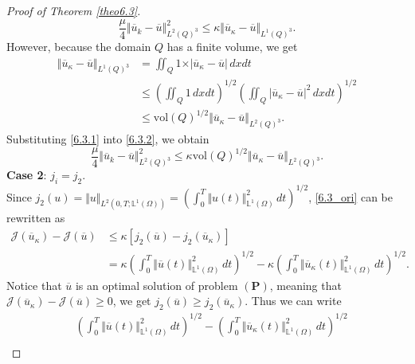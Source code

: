 \documentclass[10pt,a4paper]{amsart}
\begin{document}
\begin{proof}[Proof of Theorem \ref{theo6.3}]
\begin{equation}
			\frac{\mu}{4} \Vert \overline{u}_k - \overline{u} \Vert_{L^2(Q)^3}^2 \leq \kappa \Vert \overline{u}_\kappa - \overline{u} \Vert_{L^1(Q)^3}.
		\end{equation}
		However, because the domain $Q$ has a finite volume, we get
		\begin{equation} \label{6.3.1}
			\begin{aligned}
				\Vert \overline{u}_\kappa - \overline{u} \Vert_{L^1(Q)^3} &=\iint_Q 1\times \vert \overline{u}_\kappa - \overline{u} \vert \, dxdt \\
				& \leq \left( \iint_Q 1 \, dxdt \right)^{1/2} \left( \iint_Q \vert \overline{u}_\kappa - \overline{u} \vert^2 \, dxdt \right)^{1/2}\\
				&\leq \text{vol}(Q)^{1/2} \Vert \overline{u}_\kappa - \overline{u} \Vert_{L^2(Q)^3}.
			\end{aligned}
		\end{equation}
		Substituting \eqref{6.3.1} into \eqref{6.3.2}, we obtain
		\begin{equation} \label{sta_j1}
			\frac{\mu}{4} \Vert \overline{u}_k - \overline{u} \Vert_{L^2(Q)^3}^2 \leq \kappa \text{vol}(Q)^{1/2} \Vert \overline{u}_\kappa - \overline{u} \Vert_{L^2(Q)^3}.
		\end{equation}
		\textbf{Case 2}: $j_i=j_2$.\\
		Since $\displaystyle j_2(u)=\Vert u\Vert_{L^2(0,T;\mathbb{L}^1(\Omega))}=\left( \int_0^T \Vert u(t) \Vert_{\mathbb{L}^1(\Omega)}^2 \, dt \right)^{1/2}$, \eqref{6.3_ori} can be rewritten as
		\begin{equation} \label{6.3.4}
			\begin{aligned}
				\mathcal{J}(\overline{u}_{\kappa}) - \mathcal{J}(\overline{u}) &\leq \kappa \left[ j_2(\overline{u}) - j_2 (\overline{u}_{\kappa}) \right]\\
				&= \kappa \left( \int_0^T \Vert \overline{u}(t) \Vert_{\mathbb{L}^1(\Omega)}^2 \, dt \right)^{1/2} - \kappa \left( \int_0^T \Vert \overline{u}_{\kappa}(t) \Vert_{\mathbb{L}^1(\Omega)}^2 \, dt \right)^{1/2}.
			\end{aligned}
		\end{equation}
		Notice that $\overline{u}$ is an optimal solution of problem $(\textbf{P})$, meaning that $\mathcal{J}(\overline{u}_{\kappa}) - \mathcal{J}(\overline{u})\geq 0$, we get $j_2(\overline{u}) \geq j_2(\overline{u}_{\kappa})$. Thus we can write
		\begin{align*}
			&\left( \int_0^T \Vert \overline{u}(t) \Vert_{\mathbb{L}^1(\Omega)}^2 \, dt \right)^{1/2} - \left( \int_0^T \Vert \overline{u}_{\kappa}(t) \Vert_{\mathbb{L}^1(\Omega)}^2 \, dt \right)^{1/2} \\

\end{align*}
\end{proof}
\end{document}
